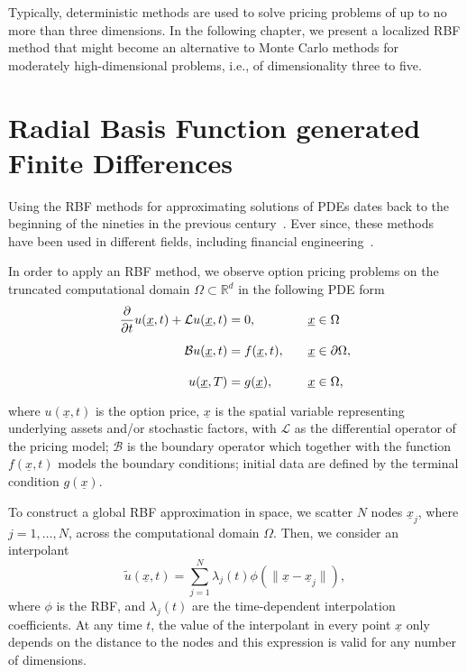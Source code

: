 \documentclass{UUThesisTemplate}
\begin{document}
\par
Typically, deterministic methods are used to solve pricing problems of up to no more than three dimensions. In the following chapter, we present a localized RBF method that might become an alternative to Monte Carlo methods for moderately high-dimensional problems, i.e., of dimensionality three to five. 
%
%





%
\chapter{Radial Basis Function generated Finite Differences}
\label{ch:rbffd}

\par
Using the RBF methods for approximating solutions of PDEs dates back to the beginning of the nineties in the previous century~\cite{kansa1990multiquadrics1,kansa1990multiquadrics2}. Ever since, these methods have been used in different fields, including financial engineering~\cite{hon1999radial, fasshauer2004using,pettersson2008improved}. 

\par
In order to apply an RBF method, we observe option pricing problems on the truncated computational domain $\Omega\subset \mathbb{R}^{d}$ in the following PDE form
\begin{alignat}{2}
\frac{\partial}{\partial t}u(\underline{x},t) + \mathcal{L}u(\underline{x},t) &= 0, \quad &&\underline{x} \in \Omega \label{eqPDE} \\
{\color{white} \frac{\partial}{\partial t}} \mathcal{B}u(\underline{x},t) &= f(\underline{x},t), \quad &&\underline{x} \in \partial \Omega, \label{eqBC} \\
{\color{white} \frac{\partial}{\partial t}} u(\underline{x},T) &= g(\underline{x}), \quad &&\underline{x} \in \Omega, \label{eqTC}
\end{alignat}
where $u(\underline{x},t)$ is the option price, $\underline{x}$ is the spatial variable representing underlying assets and/or stochastic factors, with $\mathcal{L}$ as the differential operator of the pricing model; $\mathcal{B}$ is the boundary operator which together with the function $f(\underline{x},t)$ models the boundary conditions; initial data are defined by the terminal condition $g(\underline{x})$. 

\par
To construct a global RBF approximation in space, we scatter $N$ nodes $\underline{x}_j$, where $j=1,\ldots,N$, across the computational domain $\Omega$. Then, we consider an interpolant
\begin{equation}
\label{eq:RBFint}
	\tilde{u}(\underline{x},t) = \sum_{j=1}^N \lambda_j(t) \phi(\|\underline{x}-\underline{x}_j\|),
\end{equation}
where $\phi$ is the RBF, and $\lambda_j(t)$ are the time-dependent interpolation coefficients. At any time $t$, the value of the interpolant in every point $\underline{x}$ only depends on the distance to the nodes and this expression is valid for any number of dimensions. 
\end{document}
